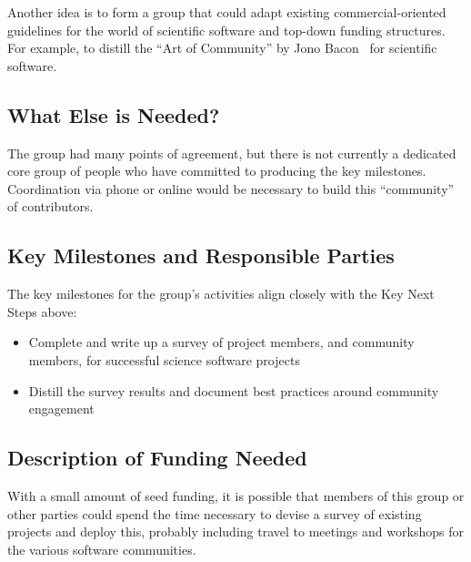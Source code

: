  Another idea is to form a group that could adapt existing commercial-oriented 
 guidelines for the world of scientific software and top-down funding structures.
 For example, to distill the ``Art of Community'' by Jono Bacon~\cite{art-of-community}
for scientific software.


\subsection{What Else is Needed?}

The group had many points of agreement, but there is not currently a dedicated core group
of people who have committed to producing the key milestones. Coordination via phone or
online would be necessary to build this ``community'' of contributors.

\subsection{Key Milestones and Responsible Parties}

The key milestones for the group's activities align closely with the Key Next Steps above:

\begin{itemize}
\item Complete and write up a survey of project members, and community members, for successful science software projects
\item Distill the survey results and document best practices around community engagement
\end{itemize}


\subsection{Description of Funding Needed}

With a small amount of seed funding, it is possible that members of this group or other parties could
spend the time necessary to devise a survey of existing projects and deploy this, probably including travel to
meetings and workshops for the various software communities.
